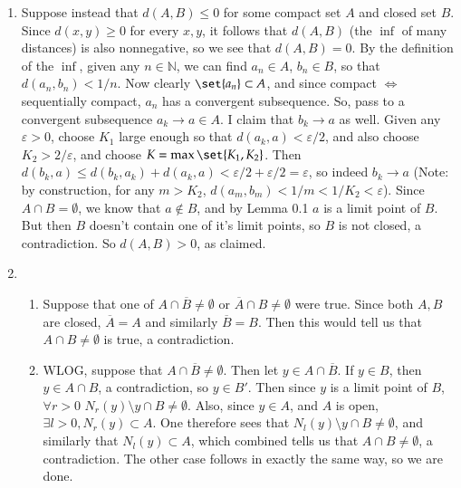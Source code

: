 \documentclass[12pt]{article}
\def\mbb#1{\mathbb{#1}}
\def\bN{\mbb{N}}
\def \ve{\varepsilon}
\theoremstyle{definition}
\theoremstyle{remark}
\begin{document}
\begin{enumerate}[leftmargin=\labelsep]
		\item Suppose instead that $d(A, B) \leq 0$ for some compact set $A$ and closed set $B$. Since $d(x, y) \geq 0$ for every $x, y$, it follows that $d(A, B)$ (the $\inf$ of many distances) is also nonnegative, so we see that $d(A,B) = 0$. By the definition of the $\inf$, given any $n \in \bN$, we can find $a_n \in A$, $b_n \in B$, so that $d(a_n, b_n) < 1/n$. Now clearly $\set{a_n} \subset A$, and since compact $\iff$ sequentially compact, $a_n$ has a convergent subsequence. So, pass to a convergent subsequence $a_k \to a \in A$. I claim that $b_k \to a$ as well. Given any $\ve > 0$, choose $K_1$ large enough so that $d(a_k, a) < \ve/2$, and also choose $K_2 > 2/\ve$, and choose $K = \max\set{K_1, K_2}$. Then $d(b_k, a) \leq d(b_k, a_k) + d(a_k, a) < \ve/2 + \ve/2 = \ve$, so indeed $b_k \to a$ (Note: by construction, for any $m > K_2$, $d(a_m, b_m) < 1/m < 1/K_2 < \ve$). Since $A \cap B = \emptyset$, we know that $a \not \in B$, and by Lemma 0.1 $a$ is a limit point of $B$. But then $B$ doesn't contain one of it's limit points, so $B$ is not closed, a contradiction. So $d(A, B) > 0$, as claimed.
		
		\item \begin{enumerate}
			\item Suppose that one of $A \cap \overline{B} \neq \emptyset$ or $\overline{A} \cap B \neq \emptyset$ were true. Since both $A, B$ are closed, $\overline{A} = A$ and similarly $\overline{B} = B$. Then this would tell us that $A \cap B \neq \emptyset$ is true, a contradiction.
			
			\item WLOG, suppose that $A \cap \overline{B} \neq \emptyset$. Then let $y \in A \cap \overline{B}$. If $y \in B$, then $y \in A \cap B$, a contradiction, so $y \in B'$. Then since $y$ is a limit point of $B$, $\forall r > 0$ $N_r(y) \setminus y \cap B \neq \emptyset$. Also, since $y \in A$, and $A$ is open, $\exists l > 0, N_r(y) \subset A$. One therefore sees that $N_l(y) \setminus y \cap B \neq \emptyset$, and similarly that $N_l(y) \subset A$, which combined tells us that $A \cap B \neq \emptyset$, a contradiction. The other case follows in exactly the same way, so we are done.
			

\end{enumerate}
\end{enumerate}
\end{document}
